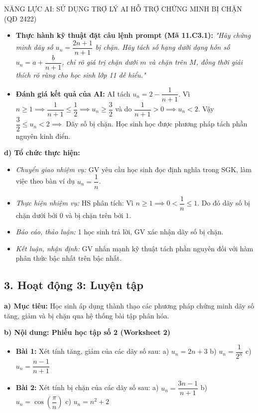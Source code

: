 \documentclass[12pt, a4paper]{article}
\begin{document}
\begin{aibox}{NĂNG LỰC AI: SỬ DỤNG TRỢ LÝ AI HỖ TRỢ CHỨNG MINH BỊ CHẶN (QĐ 2422)}  
\begin{itemize}[leftmargin=0.6cm]  
    \item \textbf{Thực hành kỹ thuật đặt câu lệnh prompt (Mã 11.C3.1):}  
    \textit{"Hãy chứng minh dãy số $u_n = \dfrac{2n + 1}{n + 1}$ bị chặn. Hãy tách số hạng dưới dạng hỗn số $u_n = a + \dfrac{b}{n+1}$, chỉ rõ giá trị chặn dưới $m$ và chặn trên $M$, đồng thời giải thích rõ ràng cho học sinh lớp 11 dễ hiểu."}  
    \item \textbf{Đánh giá kết quả của AI:} AI tách $u_n = 2 - \dfrac{1}{n+1}$. Vì $n \ge 1 \implies \dfrac{1}{n+1} \le \dfrac{1}{2} \implies u_n \ge \dfrac{3}{2}$ và do $\dfrac{1}{n+1} > 0 \implies u_n < 2$. Vậy $\dfrac{3}{2} \le u_n < 2 \implies$ Dãy số bị chặn. Học sinh học được phương pháp tách phần nguyên kinh điển.  
\end{itemize}  
\end{aibox}  
  
\noindent \textbf{d) Tổ chức thực hiện:}  
\begin{itemize}[leftmargin=0.8cm]  
    \item \textit{Chuyển giao nhiệm vụ:} GV yêu cầu học sinh đọc định nghĩa trong SGK, làm việc theo bàn ví dụ $u_n = \dfrac{1}{n}$.  
    \item \textit{Thực hiện nhiệm vụ:} HS phân tích: Vì $n \ge 1 \implies 0 < \dfrac{1}{n} \le 1$. Do đó dãy số bị chặn dưới bởi $0$ và bị chặn trên bởi $1$.  
    \item \textit{Báo cáo, thảo luận:} 1 học sinh trả lời, GV xác nhận dãy số bị chặn.  
    \item \textit{Kết luận, nhận định:} GV nhấn mạnh kỹ thuật tách phần nguyên đối với hàm phân thức bậc nhất trên bậc nhất.  
\end{itemize}  
  
\subsection*{3. Hoạt động 3: Luyện tập}  
  
\noindent \textbf{a) Mục tiêu:}  
Học sinh áp dụng thành thạo các phương pháp chứng minh dãy số tăng, giảm và bị chặn qua hệ thống bài tập phân hóa.  
  
\noindent \textbf{b) Nội dung: Phiếu học tập số 2 (Worksheet 2)}  
\begin{itemize}[leftmargin=0.6cm]  
    \item \textbf{Bài 1:} Xét tính tăng, giảm của các dãy số sau:  
    a) $u_n = 2n + 3$ \qquad b) $u_n = \dfrac{1}{2^n}$ \qquad c) $u_n = \dfrac{n - 1}{n + 1}$  
    \item \textbf{Bài 2:} Xét tính bị chặn của các dãy số sau:  
    a) $u_n = \dfrac{3n - 1}{n + 1}$ \qquad b) $u_n = \cos\left(\dfrac{\pi}{n}\right)$ \qquad c) $u_n = n^2 + 2$  
\end{itemize}  
  
\end{document}
